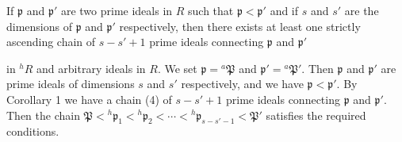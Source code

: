 If $\mathfrak{p}$ and $\mathfrak{p}'$ are two prime ideals in $R$ such that $\mathfrak{p} < \mathfrak{p}'$ and if $s$ and $s'$ are the dimensions of $\mathfrak{p}$ and $\mathfrak{p}'$ respectively, then there exists at least one strictly ascending chain of $s - s' + 1$ prime ideals connecting $\mathfrak{p}$ and $\mathfrak{p}'$

in $^h R$ and arbitrary ideals in $R$. We set $\mathfrak{p} = {}^a\mathfrak{P}$ and $\mathfrak{p}' = {}^a\mathfrak{P}'$. Then $\mathfrak{p}$ and $\mathfrak{p}'$ are prime ideals of dimensions $s$ and $s'$ respectively, and we have $\mathfrak{p} < \mathfrak{p}'$. By Corollary 1 we have a chain (4) of $s - s' + 1$ prime ideals connecting $\mathfrak{p}$ and $\mathfrak{p}'$. Then the chain $\mathfrak{P} < {}^h\mathfrak{p}_1 < {}^h\mathfrak{p}_2 < \cdots < {}^h\mathfrak{p}_{s-s'-1} < \mathfrak{P}'$ satisfies the required conditions.